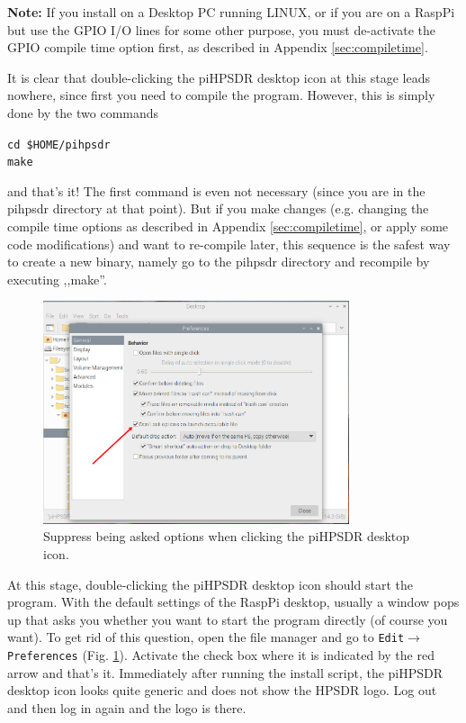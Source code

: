\documentclass[12pt]{book}
\def\grtt#1{\texttt{\color{magenta}#1}}
\def\pH{pi\-HPSDR }
\begin{document}
\textbf{Note:} If you install on a Desktop PC running LINUX, or if you are on a RaspPi but use
the GPIO I/O lines for some other purpose, you must de-activate the GPIO compile time option
first, as described in Appendix \ref{sec:compiletime}.

It is clear that double-clicking the \pH desktop icon at this stage leads nowhere,
since first you need to compile the program.
However,
this is simply done by the two commands

\grtt{cd \$HOME/pihpsdr} \\
\grtt{make}

and that's it! The first command is even not necessary (since you are in the pihpsdr
directory at that point).
But if you make changes (e.g. changing the compile time options as described in
Appendix \ref{sec:compiletime}, or apply some code modifications)
and want to re-compile later, this sequence is the safest way to create a new binary,
namely go to the pihpsdr
directory and recompile by executing ,,make''.

\begin{figure}[ht]
\center
\includegraphics[width=9cm]{piDontAsk.png}
\caption{Suppress being asked options when clicking the \pH desktop icon.}
\label{fig:piDontAsk}
\end{figure}

At this stage, double-clicking the \pH desktop icon should start the program.
With the default settings of the RaspPi desktop, usually a window pops up that
asks you whether you want to start the program directly (of course you want).
To get rid of this question, open the file manager
and go to
\texttt{Edit}$\to$\texttt{Preferences} (Fig. \ref{fig:piDontAsk}). Activate the check
box where it is indicated by the red arrow and that's it.
Immediately after running the install script, the \pH desktop icon
looks quite generic and does not show the HPSDR logo. Log out and then log in again
and the logo is there.
\end{document}
